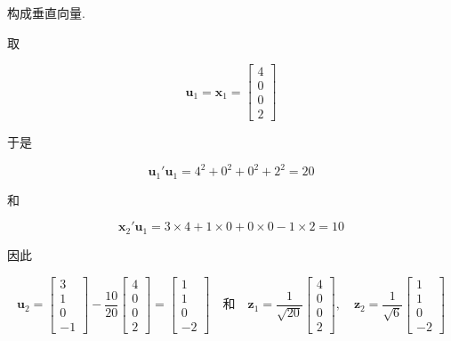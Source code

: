 构成垂直向量.

取

\[
\bm{u}_1 = \bm{x}_1 = \begin{bmatrix} 4 \\ 0 \\ 0 \\ 2 \end{bmatrix}
\]

于是

\[
\bm{u}_1'\bm{u}_1 = 4^2 + 0^2 + 0^2 + 2^2 = 20
\]

和

\[
\bm{x}_2'\bm{u}_1 = 3 \times 4 + 1 \times 0 + 0 \times 0 - 1 \times 2 = 10
\]

因此

\[
\bm{u}_2 = \begin{bmatrix} 3 \\ 1 \\ 0 \\ -1 \end{bmatrix} - \frac{10}{20} \begin{bmatrix} 4 \\ 0 \\ 0 \\ 2 \end{bmatrix} = \begin{bmatrix} 1 \\ 1 \\ 0 \\ -2 \end{bmatrix}
\quad \text{和} \quad
\bm{z}_1 = \frac{1}{\sqrt{20}} \begin{bmatrix} 4 \\ 0 \\ 0 \\ 2 \end{bmatrix},
\quad \bm{z}_2 = \frac{1}{\sqrt{6}} \begin{bmatrix} 1 \\ 1 \\ 0 \\ -2 \end{bmatrix}
\]
